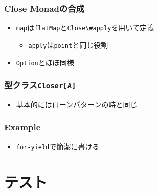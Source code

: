 \begin{frame}
  \frametitle{Close Monadの合成}

  

  

  \begin{itemize}
    \item<2-> \lstinline|map|は\lstinline|flatMap|と\lstinline|Close\#apply|を用いて定義
    \begin{itemize}
      \item<3-> \lstinline|apply|は\lstinline|point|と同じ役割
    \end{itemize}
    \item<4-> \lstinline|Option|とほぼ同様
  \end{itemize}
\end{frame}

\begin{frame}
  \frametitle{型クラス\protect\lstinline|Closer[A]|}

  

  \begin{itemize}
    \item<2-> 基本的にはローンパターンの時と同じ
  \end{itemize}
\end{frame}

\begin{frame}
  \frametitle{Example}

  

  \begin{itemize}
    \item<2-> \lstinline|for-yield|で簡潔に書ける
  \end{itemize}
\end{frame}

\section{テスト}

\begin{frame}
  \begin{center}

  \end{center}  
\end{frame}

